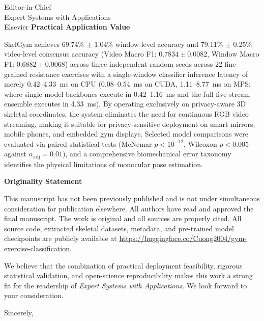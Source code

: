\documentclass[11pt]{letter}
\begin{document}
\begin{letter}{Editor-in-Chief\\Expert Systems with Applications\\Elsevier}
\noindent\textbf{Practical Application Value}

SkelGym achieves 69.74\% $\pm$ 1.04\% window-level accuracy and 79.11\% $\pm$ 0.25\% video-level consensus accuracy (Video Macro F1: $0.7834 \pm 0.0082$, Window Macro F1: $0.6882 \pm 0.0068$) across three independent random seeds across 22 fine-grained resistance exercises with a single-window classifier inference latency of merely 0.42--4.33~ms on CPU (0.08--0.54~ms on CUDA, 1.11--8.77~ms on MPS; where single-model backbones execute in 0.42--1.16~ms and the full five-stream ensemble executes in 4.33~ms). By operating exclusively on privacy-aware 3D skeletal coordinates, the system eliminates the need for continuous RGB video streaming, making it suitable for privacy-sensitive deployment on smart mirrors, mobile phones, and embedded gym displays. Selected model comparisons were evaluated via paired statistical tests (McNemar $p < 10^{-12}$, Wilcoxon $p < 0.005$ against $\alpha_{\text{adj}} = 0.01$), and a comprehensive biomechanical error taxonomy identifies the physical limitations of monocular pose estimation.

\noindent\textbf{Originality Statement}

This manuscript has not been previously published and is not under simultaneous consideration for publication elsewhere. All authors have read and approved the final manuscript. The work is original and all sources are properly cited. All source code, extracted skeletal datasets, metadata, and pre-trained model checkpoints are publicly available at \url{https://huggingface.co/Cuong2004/gym-exercise-classification}.

We believe that the combination of practical deployment feasibility, rigorous statistical validation, and open-science reproducibility makes this work a strong fit for the readership of \textit{Expert Systems with Applications}. We look forward to your consideration.

\closing{Sincerely,}

\end{letter}
\end{document}
